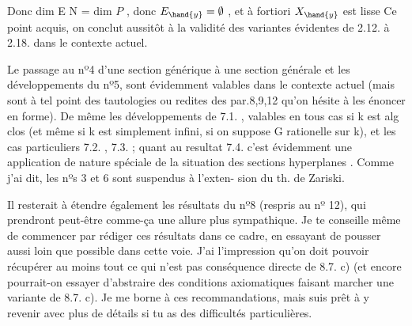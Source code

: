 
Donc dim E \hand{$<$} N = dim $P$ , donc $E_{\hand{y}} = \emptyset$ , et à fortiori $X_{\hand{y}}$ est lisse
Ce point acquis, on conclut aussitôt à la validité des variantes
évidentes de 2.12. à 2.18. dans le contexte actuel.

Le passage au nº4 d'une section générique à une section générale
et les développements du nº5, sont évidemment valables dans le contexte
actuel (mais sont à tel point des tautologies ou redites des
par.8,9,12  qu'on hésite à les énoncer en forme). De même les
développements de 7.1. , valables en tous cas si k est  alg clos
(et même si k est simplement infini, si on suppose G rationelle sur k),
et les cas particuliers 7.2. , 7.3. ; quant au resultat 7.4. 
c'est évidemment une application de nature spéciale de  la situation des sections
hyperplanes . Comme j'ai dit, les nºs 3 et 6 sont suspendus à l'exten-%
sion du th. de Zariski.

Il resterait à étendre également les résultats du nº8 (respris au
nº 12), qui prendront peut-être comme-ça une allure plus sympathique.
Je te conseille même de commencer par rédiger ces résultats dans ce cadre,
en essayant de pousser aussi loin que possible dans cette voie. J'ai
l'impression qu'on doit pouvoir récupérer au moins tout ce qui n'est pas
conséquence directe de 8.7. c) (et encore pourrait-on essayer
d'abstraire des conditions axiomatiques faisant marcher une variante de
8.7. c). Je me borne à ces recommandations, mais suis prêt à y revenir
avec plus de détails si tu as des difficultés particulières.

